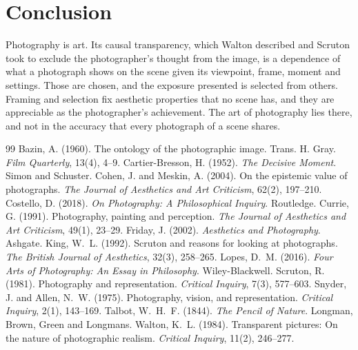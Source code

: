 \documentclass{situationist-preprint}
\begin{document}
\section{Conclusion}

Photography is art. Its causal transparency, which Walton described and Scruton took to exclude the photographer's thought from the image, is a dependence of what a photograph shows on the scene given its viewpoint, frame, moment and settings. Those are chosen, and the exposure presented is selected from others. Framing and selection fix aesthetic properties that no scene has, and they are appreciable as the photographer's achievement. The art of photography lies there, and not in the accuracy that every photograph of a scene shares.

\begin{thebibliography}{99}\small
{} Bazin, A. (1960). The ontology of the photographic image. Trans. H. Gray. \emph{Film Quarterly}, 13(4), 4--9.
 Cartier-Bresson, H. (1952). \emph{The Decisive Moment}. Simon and Schuster.
 Cohen, J. and Meskin, A. (2004). On the epistemic value of photographs. \emph{The Journal of Aesthetics and Art Criticism}, 62(2), 197--210.
 Costello, D. (2018). \emph{On Photography: A Philosophical Inquiry}. Routledge.
 Currie, G. (1991). Photography, painting and perception. \emph{The Journal of Aesthetics and Art Criticism}, 49(1), 23--29.
 Friday, J. (2002). \emph{Aesthetics and Photography}. Ashgate.
 King, W.~L. (1992). Scruton and reasons for looking at photographs. \emph{The British Journal of Aesthetics}, 32(3), 258--265.
 Lopes, D.~M. (2016). \emph{Four Arts of Photography: An Essay in Philosophy}. Wiley-Blackwell.
 Scruton, R. (1981). Photography and representation. \emph{Critical Inquiry}, 7(3), 577--603.
 Snyder, J. and Allen, N.~W. (1975). Photography, vision, and representation. \emph{Critical Inquiry}, 2(1), 143--169.
 Talbot, W.~H.~F. (1844). \emph{The Pencil of Nature}. Longman, Brown, Green and Longmans.
 Walton, K.~L. (1984). Transparent pictures: On the nature of photographic realism. \emph{Critical Inquiry}, 11(2), 246--277.
\end{thebibliography}
\end{document}
